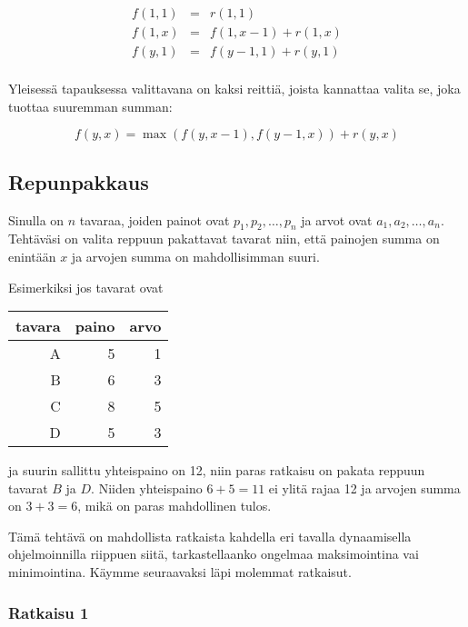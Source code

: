 \[
\begin{array}{lcl}
f(1,1) & = & r(1,1) \\
f(1,x) & = & f(1,x-1)+r(1,x) \\
f(y,1) & = & f(y-1,1)+r(y,1)\\
\end{array}
\]

Yleisessä tapauksessa valittavana on
kaksi reittiä,
joista kannattaa valita se,
joka tuottaa suuremman summan:

\[ f(y,x) = \max(f(y,x-1),f(y-1,x))+r(y,x)\]

\subsection{Repunpakkaus}


\begin{task}
Sinulla on $n$ tavaraa, joiden painot ovat
$p_1,p_2,\ldots,p_n$ ja arvot ovat
$a_1,a_2,\ldots,a_n$.
Tehtäväsi on valita reppuun pakattavat tavarat
niin, että painojen summa on enintään $x$
ja arvojen summa on mahdollisimman suuri.
\end{task}

Esimerkiksi jos tavarat ovat

\begin{center}
\begin{tabular}{rrr}
tavara & paino & arvo \\
\hline
A & 5 & 1 \\
B & 6 & 3 \\
C & 8 & 5 \\
D & 5 & 3 \\
\end{tabular}
\end{center}

ja suurin sallittu yhteispaino on 12,
niin paras ratkaisu on pakata reppuun tavarat $B$ ja $D$.
Niiden yhteispaino $6+5=11$ ei ylitä rajaa 12
ja arvojen summa
on $3+3=6$, mikä on paras mahdollinen tulos.

Tämä tehtävä on mahdollista ratkaista kahdella eri
tavalla dynaamisella ohjelmoinnilla
riippuen siitä, tarkastellaanko ongelmaa
maksimointina vai minimointina.
Käymme seuraavaksi läpi molemmat ratkaisut.

\subsubsection{Ratkaisu 1}

